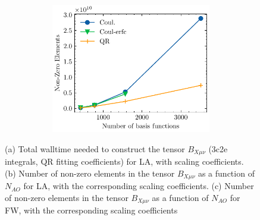 \begin{figure}
\begin{subfigure}{\textwidth}
\begin{subfigure}{0.45\textwidth}
\centering
\includegraphics[width=\textwidth]{Pics/eri_nze_fw}
\end{subfigure}
\hfill
\begin{subtable}{0.45\textwidth}
\centering
{}
\end{subtable}
\caption{}
\label{fig:GS_BNZE_FW}
\end{subfigure}
\caption[Scaling property of $B_{X\mu\nu}$ for LA.]{(a) Total walltime needed to construct the tensor $B_{X\mu\nu}$ (3c2e integrals, QR fitting coefficients) for LA, with scaling coefficients. (b) Number of non-zero elements in the tensor $B_{X\mu\nu}$ as a function of $N_{AO}$ for LA, with the corresponding scaling coefficients. (c) Number of non-zero elements in the tensor $B_{X\mu\nu}$ as a function of $N_{AO}$ for FW, with the corresponding scaling coefficients}
\end{figure}


